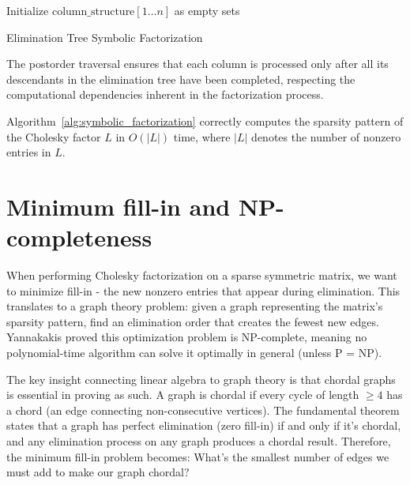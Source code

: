 \begin{algorithm}
\BlankLine
Initialize $\text{column\_structure}[1 \ldots n]$ as empty sets\;
\caption{Elimination Tree Symbolic Factorization}
\label{alg:symbolic_factorization}
\end{algorithm}

The postorder traversal ensures that each column is processed only after all its descendants in the elimination tree have been completed, respecting the computational dependencies inherent in the factorization process.

\begin{theorem}
Algorithm~\ref{alg:symbolic_factorization} correctly computes the sparsity pattern of the Cholesky factor $L$ in $O(|L|)$ time, where $|L|$ denotes the number of nonzero entries in $L$.
\end{theorem}

\newpage


\section{Minimum fill-in and NP-completeness}

When performing Cholesky factorization on a sparse symmetric matrix, we want to minimize fill-in - the new nonzero entries that appear during elimination. This translates to a graph theory problem: given a graph representing the matrix's sparsity pattern, find an elimination order that creates the fewest new edges. Yannakakis \cite{yannakakis_computing_1981} proved this optimization problem is NP-complete, meaning no polynomial-time algorithm can solve it optimally in general (unless P = NP).

The key insight connecting linear algebra to graph theory is that chordal graphs is essential in proving as such. A graph is chordal if every cycle of length $\geq 4$ has a chord (an edge connecting non-consecutive vertices). The fundamental theorem states that a graph has perfect elimination (zero fill-in) if and only if it's chordal, and any elimination process on any graph produces a chordal result. Therefore, the minimum fill-in problem becomes: What's the smallest number of edges we must add to make our graph chordal?

